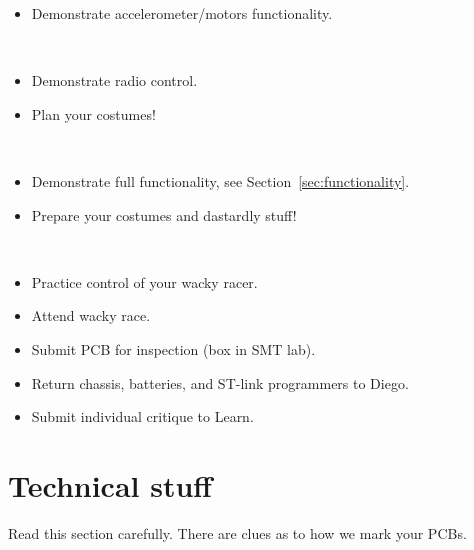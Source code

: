 \documentclass[11pt, a4paper]{article}
\newcommand{\refsec}[1]{\mbox{Section~\ref{sec:#1}}}
\begin{document}
\begin{description}
  \begin{itemize}
  \item Demonstrate accelerometer/motors functionality.
  \end{itemize}

\item [Week~10]\mbox{}\\[-0.4cm]

  \begin{itemize}
  \item Demonstrate radio control.

  \item Plan your costumes!
  \end{itemize}

\item [Week~11]\mbox{}\\[-0.4cm]

  \begin{itemize}
  \item Demonstrate full functionality, see \refsec{functionality}.

  \item Prepare your costumes and dastardly stuff!
  \end{itemize}

\item [Week~12]\mbox{}\\[-0.4cm]

  \begin{itemize}
  \item Practice control of your wacky racer.

  \item Attend wacky race.

  \item Submit PCB for inspection (box in SMT lab).

  \item Return chassis, batteries, and ST-link programmers to Diego.

  \item Submit individual critique to Learn.
  \end{itemize}

\end{description}



\section{Technical stuff}

Read this section carefully.  There are clues as to how we mark your PCBs.
\end{document}
